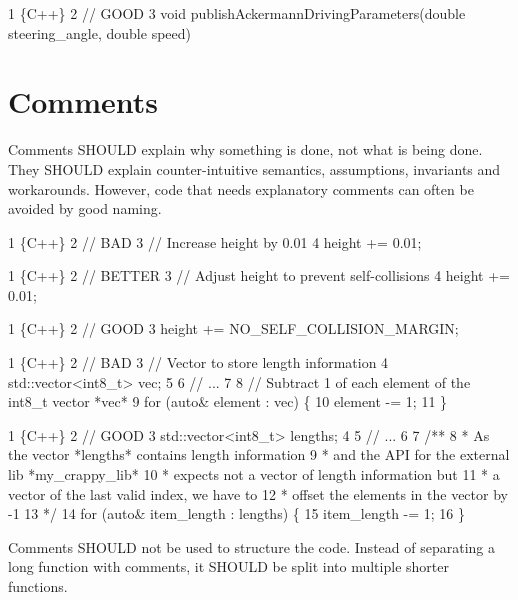 \begin{DoxyCode}
1 \{C++\}
2 // GOOD
3 void publishAckermannDrivingParameters(double steering\_angle, double speed)
\end{DoxyCode}


\section*{Comments}

Comments S\+H\+O\+U\+LD explain why something is done, not what is being done. They S\+H\+O\+U\+LD explain counter-\/intuitive semantics, assumptions, invariants and workarounds. However, code that needs explanatory comments can often be avoided by good naming.


\begin{DoxyCode}
1 \{C++\}
2 // BAD
3 // Increase height by 0.01
4 height += 0.01;
\end{DoxyCode}



\begin{DoxyCode}
1 \{C++\}
2 // BETTER
3 // Adjust height to prevent self-collisions
4 height += 0.01;
\end{DoxyCode}



\begin{DoxyCode}
1 \{C++\}
2 // GOOD
3 height += NO\_SELF\_COLLISION\_MARGIN;
\end{DoxyCode}



\begin{DoxyCode}
1 \{C++\}
2 // BAD
3 // Vector to store length information
4 std::vector<int8\_t> vec;
5 
6 // ...
7 
8 // Subtract 1 of each element of the int8\_t vector *vec*
9 for (auto& element : vec) \{
10     element -= 1;
11 \}
\end{DoxyCode}



\begin{DoxyCode}
1 \{C++\}
2 // GOOD
3 std::vector<int8\_t> lengths;
4 
5 // ...
6 
7 /**
8  *   As the vector *lengths* contains length information
9  *   and the API for the external lib *my\_crappy\_lib*
10  *   expects not a vector of length information but
11  *   a vector of the last valid index, we have to 
12  *   offset the elements in the vector by -1
13  */
14 for (auto& item\_length : lengths) \{
15     item\_length -= 1;
16 \}
\end{DoxyCode}


Comments S\+H\+O\+U\+LD not be used to structure the code. Instead of separating a long function with comments, it S\+H\+O\+U\+LD be split into multiple shorter functions.

